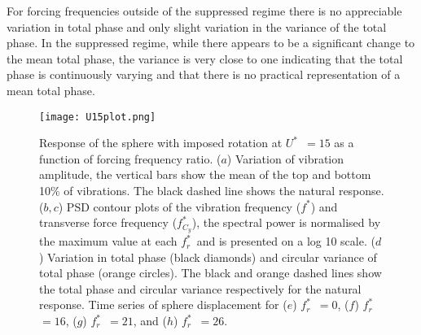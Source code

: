 \documentclass[3p]{elsarticle}
\newcommand{\Ustar}{\ensuremath{U^{*}}}
\newcommand{\fstar}{\ensuremath{f^{*}}}
\newcommand{\freqrat}{\ensuremath{f_r^*}}
\newcommand{\fCystar}{\ensuremath{f^*_{C_y}}}
\begin{document}
For forcing frequencies outside of the suppressed regime there is no
appreciable variation in total phase and only slight variation in the
variance of the total phase. In the suppressed regime, while there
appears to be a significant change to the mean total phase, the
variance is very close to one indicating that the total phase is
continuously varying and that there is no practical representation of
a mean total phase.
%
\begin{figure}
	\centering
	\texttt{[image: U15plot.png]}
	\caption{Response of the sphere with imposed rotation at
		\Ustar~$=15$ as a function of forcing frequency ratio. ($a$) Variation of vibration amplitude, the vertical bars show the mean of the top and bottom 10\% of vibrations. The black dashed line shows the natural response. ($b,c$) PSD contour plots of the vibration frequency (\fstar) and
		transverse force frequency (\fCystar), the spectral power is normalised by the maximum value at each \freqrat~and is
		presented on a log 10 scale. ($d$) Variation in total phase (black diamonds) and circular variance of total phase
		(orange circles). The black and orange dashed lines show the total phase and circular variance respectively
		for the natural response. Time series of sphere displacement for ($e$) \freqrat~$=0$,
		($f$) \freqrat~$=16$, ($g$) \freqrat~$=21$, and ($h$)
		\freqrat~$=26$.}
	\label{fig:U15}
\end{figure}
%
\end{document}
